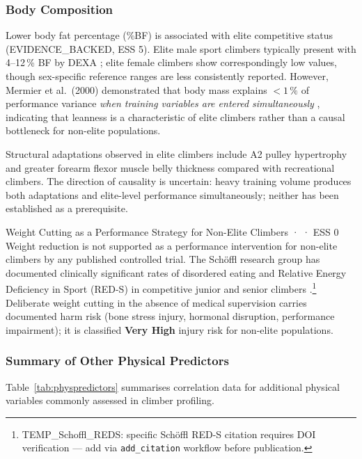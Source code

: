 \subsubsection{Body Composition}

Lower body fat percentage (\%BF) is associated with elite competitive status (EVIDENCE\_BACKED, ESS 5).
Elite male sport climbers typically present with 4--12\,\% BF by DEXA \cite{TEMP_Ozimek2023}; elite female climbers show correspondingly low values, though sex-specific reference ranges are less consistently reported.
However, Mermier et al.\ (2000) demonstrated that body mass explains $< 1\,\%$ of performance variance \emph{when training variables are entered simultaneously} \cite{MJPS00}, indicating that leanness is a characteristic of elite climbers rather than a causal bottleneck for non-elite populations.

Structural adaptations observed in elite climbers include A2 pulley hypertrophy and greater forearm flexor muscle belly thickness compared with recreational climbers.
The direction of causality is uncertain: heavy training volume produces both adaptations and elite-level performance simultaneously; neither has been established as a prerequisite.

\begin{toverifybox}{Weight Cutting as a Performance Strategy for Non-Elite Climbers · \toverify · ESS 0}
Weight reduction is not supported as a performance intervention for non-elite climbers by any published controlled trial.
The Sch\"{o}ffl research group has documented clinically significant rates of disordered eating and Relative Energy Deficiency in Sport (RED-S) in competitive junior and senior climbers \cite{TEMP_Schoffl_REDS}.\footnote{TEMP\_Schoffl\_REDS: specific Sch\"{o}ffl RED-S citation requires DOI verification --- add via \texttt{add\_citation} workflow before publication.}
Deliberate weight cutting in the absence of medical supervision carries documented harm risk (bone stress injury, hormonal disruption, performance impairment); it is classified \textbf{Very High} injury risk for non-elite populations.
\end{toverifybox}

\subsubsection{Summary of Other Physical Predictors}

Table~\ref{tab:physpredictors} summarises correlation data for additional physical variables commonly assessed in climber profiling.

